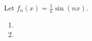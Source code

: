 Let $f_n(x)=\frac1n\sin(nx)$.

\begin{enumerate}

    \item 
    \pagebreak
    \item 

\end{enumerate}